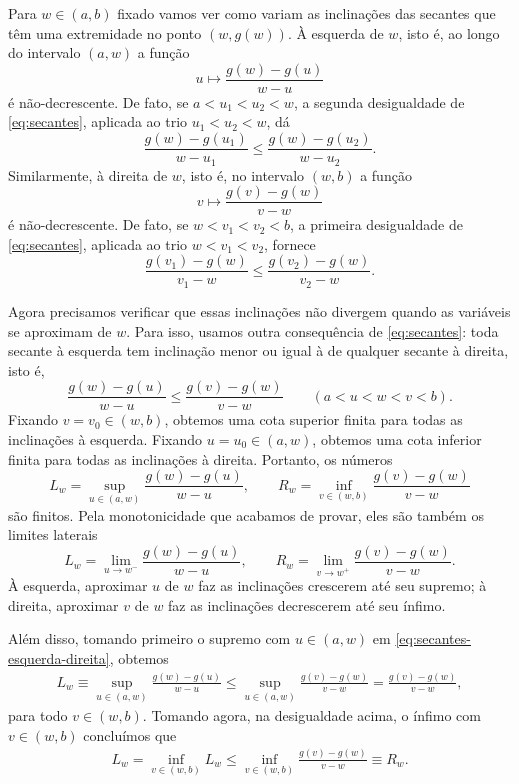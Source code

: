 \documentclass[12pt,portuguese]{article}
\theoremstyle{definition}
\theoremstyle{plainexercise}
\theoremstyle{starredexercise}
\theoremstyle{definition}
\begin{document}
Para $w\in(a,b)$ fixado vamos ver como variam as inclinações das secantes que
têm uma extremidade no ponto $(w,g(w))$. À esquerda de $w$, isto é, 
ao longo do intervalo $(a,w)$ a função
\[
u\longmapsto\frac{g(w)-g(u)}{w-u}
\]
é não-decrescente. De fato, se $a<u_1<u_2<w$, a segunda
desigualdade de \eqref{eq:secantes}, aplicada ao trio $u_1<u_2<w$, dá
\[
\frac{g(w)-g(u_1)}{w-u_1}
\leqslant
\frac{g(w)-g(u_2)}{w-u_2}.
\]
Similarmente, à direita de $w$, isto é, no intervalo $(w,b)$ a função
\[
v\longmapsto\frac{g(v)-g(w)}{v-w}
\]
é não-decrescente. De fato, se $w<v_1<v_2<b$, a primeira
desigualdade de \eqref{eq:secantes}, aplicada ao trio $w<v_1<v_2$, fornece
\[
\frac{g(v_1)-g(w)}{v_1-w}
\leqslant
\frac{g(v_2)-g(w)}{v_2-w}.
\]

Agora precisamos verificar que essas inclinações não divergem quando
as variáveis se aproximam de $w$. Para isso, usamos outra consequência
de \eqref{eq:secantes}: toda secante à esquerda tem inclinação menor ou
igual à de qualquer secante à direita, isto é,
\begin{equation}\label{eq:secantes-esquerda-direita}
\frac{g(w)-g(u)}{w-u}
\leqslant
\frac{g(v)-g(w)}{v-w}
\qquad (a<u<w<v<b).
\end{equation}
Fixando $v=v_0\in(w,b)$, obtemos uma cota superior finita para todas as
inclinações à esquerda. Fixando $u=u_0\in(a,w)$, obtemos uma cota inferior
finita para todas as inclinações à direita. Portanto, os números
\[
L_w=\sup_{u\in(a,w)}\frac{g(w)-g(u)}{w-u},
\qquad
R_w=\inf_{v\in(w,b)}\frac{g(v)-g(w)}{v-w}
\]
são finitos. Pela monotonicidade que acabamos de provar, eles são também
os limites laterais
\[
L_w=\lim_{u\to w^-}\frac{g(w)-g(u)}{w-u},
\qquad
R_w=\lim_{v\to w^+}\frac{g(v)-g(w)}{v-w}.
\]
À esquerda, aproximar $u$ de $w$ faz as inclinações crescerem até seu
supremo; à direita, aproximar $v$ de $w$ faz as inclinações decrescerem até
seu ínfimo.

Além disso, tomando primeiro o supremo com $u\in (a,w)$ em \eqref{eq:secantes-esquerda-direita}, obtemos 
\begin{align*}
L_{w}\equiv 
\sup_{u\in(a,w)}\frac{g(w)-g(u)}{w-u}
\leqslant
\sup_{u\in(a,w)}
\frac{g(v)-g(w)}{v-w}
=
\frac{g(v)-g(w)}{v-w},
\end{align*}
para todo $v\in (w,b)$. 
Tomando agora, na desigualdade acima, o ínfimo com $v\in (w,b)$ concluímos que
\begin{align*}
L_{w}
=
\inf_{v\in(w,b)} L_{w} 
\leqslant
\inf_{v\in(w,b)} \frac{g(v)-g(w)}{v-w}
\equiv 
R_{w}.
\end{align*}
\end{document}

